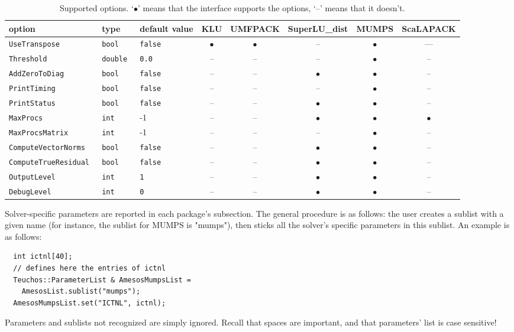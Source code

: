 \documentclass[11pt]{SANDreport}
\begin{document}
\begin{sidewaystable}[tbhp]
  \centering
  \begin{tabular}{| p{5cm} | p{2cm} | p{2cm} | c | c | c
      | c | c |}
    \hline
    option & type & default value & KLU & 
    UMFPACK & SuperLU\_dist &  MUMPS & 
    ScaLAPACK \\
    \hline
    \tt UseTranspose & \tt bool & \tt false & $\bullet$ & $\bullet$ & -- & $\bullet$
    & ---\\
    \tt Threshold & \tt double & \tt 0.0 & -- & -- & -- & $\bullet$ & --
    \\
    \tt AddZeroToDiag & \tt bool & \tt false & -- & -- & $\bullet$ &
    $\bullet$ & -- \\
    \tt PrintTiming & \tt bool & \tt false & -- & -- & -- & $\bullet$ &
    -- \\
    \tt PrintStatus & \tt bool & \tt false & -- & -- & $\bullet$  &
    $\bullet$ & -- \\
    \tt MaxProcs & \tt int & -1 & -- & -- & $\bullet$  & $\bullet$  &
    $\bullet$  \\
    \tt MaxProcsMatrix & \tt int & -1 & -- & -- & -- & $\bullet$  & --
    \\
    \tt ComputeVectorNorms & \tt bool & \tt false & -- & -- & $\bullet$ & $\bullet$
    & -- \\
    \tt ComputeTrueResidual & \tt bool & \tt false & -- & -- & $\bullet$ &
    $\bullet$ & -- \\
    \tt OutputLevel & \tt int & \tt 1 & -- & -- & $\bullet$ &
    $\bullet$ & -- \\
    \tt DebugLevel & \tt int & \tt 0 & -- & -- & $\bullet$ &
    $\bullet$ & -- \\
    \hline
  \end{tabular}
  \caption{Supported options. `$\bullet$' means that the interface
    supports the options, `--' means that it doesn't.}
  \label{tab:options}
\end{sidewaystable}

Solver-specific parameters are reported in each package's
subsection. The general procedure is as follows: the user creates a
sublist with a given name (for instance, the sublist for MUMPS is
"mumps"), then sticks all the solver's specific parameters in this
sublist. An example is as follows:
\begin{verbatim}
  int ictnl[40];
  // defines here the entries of ictnl
  Teuchos::ParameterList & AmesosMumpsList = 
    AmesosList.sublist("mumps");
  AmesosMumpsList.set("ICTNL", ictnl);
\end{verbatim}
Parameters and sublists not recognized are simply ignored. Recall that
spaces are important, and that parameters' list is case sensitive!
\end{document}
